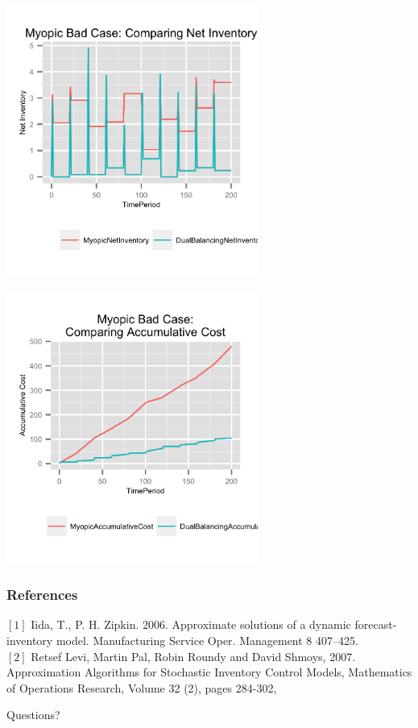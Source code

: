 \documentclass{beamer}
\begin{document}
\begin{frame}
  \includegraphics[height=3.5in]{figures/MyopicBadNetInventory.png}
\end{frame}


\begin{frame}
  \includegraphics[height=3.5in]{figures/MyopicBadAccumulativeCost.png}
\end{frame}

\begin{frame}
    \frametitle{References}
    $[1]$ Iida, T., P. H. Zipkin. 2006. Approximate solutions of a dynamic forecast-inventory model. Manufacturing Service Oper. Management
8 407–425.\\

    $[2]$ Retsef Levi, Martin Pal, Robin Roundy and David Shmoys, 2007. Approximation Algorithms for Stochastic Inventory Control Models, Mathematics of Operations Research, Volume 32 (2), pages 284-302, 
\end{frame}
\begin{frame}
\Large
  \begin{center}
  Questions?
  \end{center}
\end{frame}
\end{document}
